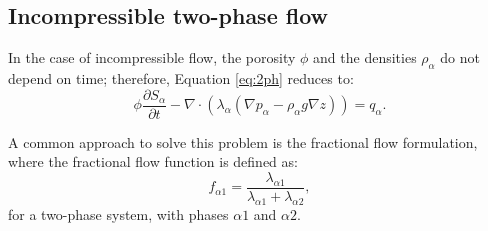 \documentclass{article}
\begin{document}
\subsection*{Incompressible two-phase flow}
\hspace{0.5cm}In the case of incompressible flow, the porosity $\phi$ and the densities 
$\rho_{\alpha}$ do not depend on time; therefore, Equation \eqref{eq:2ph} reduces to: 
\begin{equation}\label{eq:2ph1}
 \phi \frac{\partial S_{\alpha}}{\partial t}-\nabla \cdot (  \lambda_{\alpha}(\nabla p_{\alpha}-\rho_{\alpha}g \nabla z))= q_{\alpha}.
\end{equation}\par
A common approach to solve this problem is the fractional flow formulation, where the fractional flow function is defined as:
\begin{equation}\label{eq:fff}f_{\alpha1}=\frac{\lambda_{\alpha1}}{\lambda_{\alpha1}+\lambda_{\alpha2}},\end{equation}
for a two-phase system, with phases $\alpha1$ and $\alpha2$.
\end{document}
